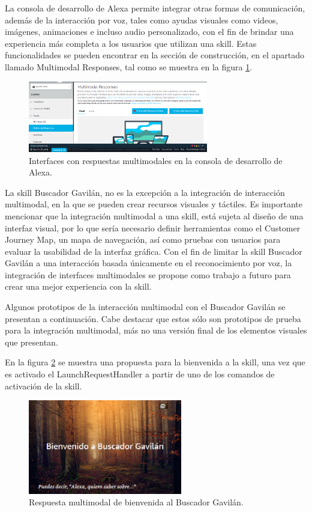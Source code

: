 La consola de desarrollo de Alexa permite integrar otras formas de comunicación, además de la interacción por voz, tales como ayudas visuales como videos, imágenes, animaciones e incluso audio personalizado, con el fin de brindar una experiencia más completa a los usuarios que utilizan una skill. Estas funcionalidades se pueden encontrar en la sección de construcción, en el apartado llamado Multimodal Responses, tal como se muestra en la figura \ref{fig:51}.

\begin{figure}[H]
  \centering
  \includegraphics[width=0.70\textwidth]{Cap5/Figuras/AlexaMultimodalResponses.png}
  \caption{Interfaces con respuestas multimodales en la consola de desarrollo de Alexa.}
  \label{fig:51}
\end{figure}

La skill Buscador Gavilán, no es la excepción a la integración de interacción multimodal, en la que se pueden crear recursos visuales y táctiles. Es importante mencionar que la integración multimodal a una skill, está sujeta al diseño de una interfaz visual, por lo que sería necesario definir herramientas como el Customer Journey Map, un mapa de navegación, así como pruebas con usuarios para evaluar la usabilidad de la interfaz gráfica. Con el fin de limitar la skill Buscador Gavilán a una interacción basada únicamente en el reconocimiento por voz, la integración de interfaces multimodales se propone como trabajo a futuro para crear una mejor experiencia con la skill.

Algunos prototipos de la interacción multimodal con el Buscador Gavilán se presentan a continuación. Cabe destacar que estos sólo son prototipos de prueba para la integración multimodal, más no una versión final de los elementos visuales que presentan.

En la figura \ref{fig:52} se muestra una propuesta para la bienvenida a la skill, una vez que es activado el LaunchRequestHandler a partir de uno de los comandos de activación de la skill.

\begin{figure}[H]
  \centering
  \includegraphics[width=0.60\textwidth]{Cap5/Figuras/Multimodal1.png}
  \caption{Respuesta multimodal de bienvenida al Buscador Gavilán.}
  \label{fig:52}
\end{figure}


